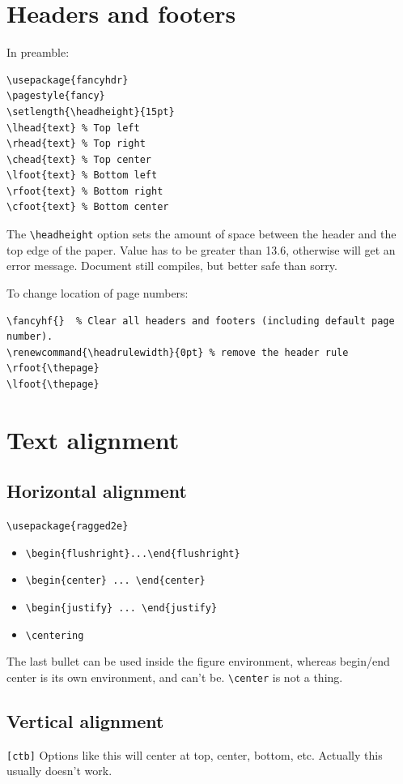 \documentclass{article}
\begin{document}
\section{Headers and footers}\label{headfoot}
In preamble:
\begin{verbatim}
\usepackage{fancyhdr}
\pagestyle{fancy}
\setlength{\headheight}{15pt}
\lhead{text} % Top left
\rhead{text} % Top right
\chead{text} % Top center
\lfoot{text} % Bottom left
\rfoot{text} % Bottom right
\cfoot{text} % Bottom center
\end{verbatim}

The \verb|\headheight| option sets the amount of space between the
header and the top edge of the paper. Value has to be greater than
13.6, otherwise will get an error message. Document still
compiles, but better safe than sorry.

To change location of page numbers:
\begin{verbatim}
\fancyhf{}  % Clear all headers and footers (including default page number).
\renewcommand{\headrulewidth}{0pt} % remove the header rule
\rfoot{\thepage}
\lfoot{\thepage}
\end{verbatim}

\section{Text alignment}
\subsection{Horizontal alignment}
\verb|\usepackage{ragged2e}|
\begin{itemize}
    \item \verb|\begin{flushright}...\end{flushright}|
    \item \verb|\begin{center} ... \end{center}|
    \item \verb|\begin{justify} ... \end{justify}|
    \item \verb|\centering|
\end{itemize}

The last bullet can be used inside the figure environment, whereas
begin/end center is its own environment, and can't be.
\verb|\center| is not a thing.

\subsection{Vertical alignment}
\verb|[ctb]| Options like this will center at top, center, bottom, etc.
Actually this usually doesn't work.
\end{document}
